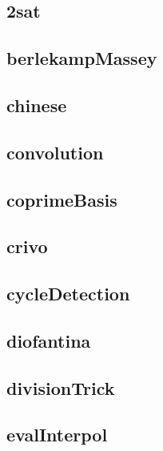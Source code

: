 \subsection{2sat}
\raggedbottom
\hrulefill
\subsection{berlekampMassey}
\raggedbottom
\hrulefill
\subsection{chinese}
\raggedbottom
\hrulefill
\subsection{convolution}
\raggedbottom
\hrulefill
\subsection{coprimeBasis}
\raggedbottom
\hrulefill
\subsection{crivo}
\raggedbottom
\hrulefill
\subsection{cycleDetection}
\raggedbottom
\hrulefill
\subsection{diofantina}
\raggedbottom
\hrulefill
\subsection{divisionTrick}
\raggedbottom
\hrulefill
\subsection{evalInterpol}
\raggedbottom
\hrulefill
